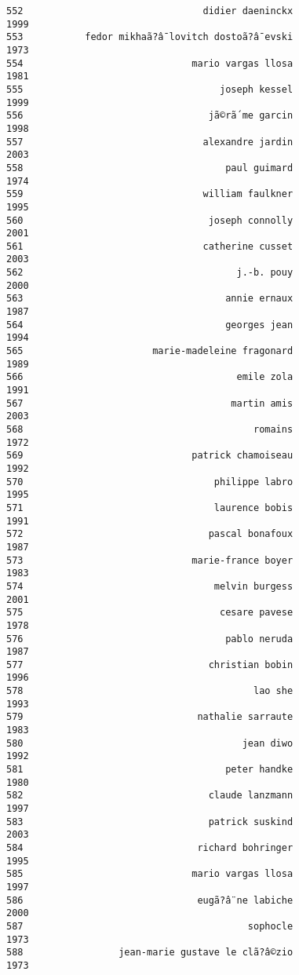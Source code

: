 \documentclass[
]{report}
\begin{document}
\begin{verbatim}
552                                didier daeninckx                1999
553           fedor mikhaã?â¯lovitch dostoã?â¯evski                1973
554                              mario vargas llosa                1981
555                                   joseph kessel                1999
556                                 jã©rã´me garcin                1998
557                                alexandre jardin                2003
558                                    paul guimard                1974
559                                william faulkner                1995
560                                 joseph connolly                2001
561                                catherine cusset                2003
562                                      j.-b. pouy                2000
563                                    annie ernaux                1987
564                                    georges jean                1994
565                       marie-madeleine fragonard                1989
566                                      emile zola                1991
567                                     martin amis                2003
568                                         romains                1972
569                              patrick chamoiseau                1992
570                                  philippe labro                1995
571                                  laurence bobis                1991
572                                 pascal bonafoux                1987
573                              marie-france boyer                1983
574                                  melvin burgess                2001
575                                   cesare pavese                1978
576                                    pablo neruda                1987
577                                 christian bobin                1996
578                                         lao she                1993
579                               nathalie sarraute                1983
580                                       jean diwo                1992
581                                    peter handke                1980
582                                 claude lanzmann                1997
583                                 patrick suskind                2003
584                               richard bohringer                1995
585                              mario vargas llosa                1997
586                               eugã?â¨ne labiche                2000
587                                        sophocle                1973
588                 jean-marie gustave le clã?â©zio                1973

\end{verbatim}
\end{document}
